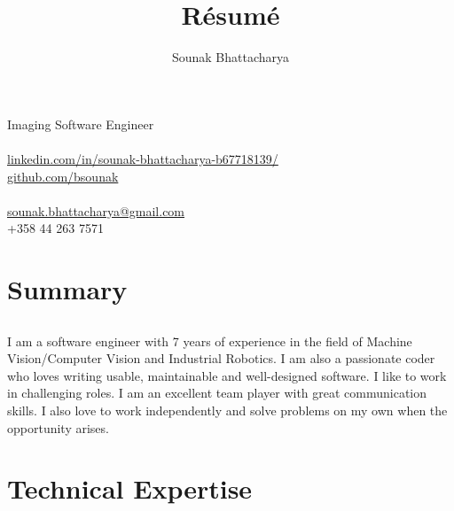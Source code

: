 \documentclass{article}
\renewcommand{\maketitle}{
\begin{center}
{\huge\bfseries
\theauthor}

\end{center}
}
\begin{document}
\title{R\'esum\'e}
\author{Sounak Bhattacharya}

\maketitle

\begin{center}
{\Large Imaging Software Engineer}\\~\\
\href{https://www.linkedin.com/in/sounak-bhattacharya-b67718139/}{linkedin.com/in/sounak-bhattacharya-b67718139/}\\
\href{https://github.com/bsounak}{github.com/bsounak}\\~\\
\href{mailto:sounak.bhattacharya@gmail.com}{sounak.bhattacharya@gmail.com}\\
+358 44 263 7571
\end{center}

\section{Summary}
\subsection{}
I am a software engineer with 7 years of experience in the field of Machine
Vision/Computer Vision and Industrial Robotics. I am also a passionate coder
who loves writing usable, maintainable and well-designed software. I like to
work in challenging roles. I am an excellent team player with great
communication skills. I also love to work independently and solve problems on
my own when the opportunity arises.
\subsection{}

\section{Technical Expertise}
\end{document}
